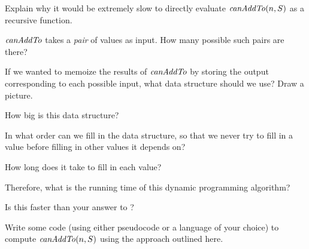 \documentclass{tufte-handout}
\begin{document}
\begin{questions}
  \item Explain why it would be extremely slow to directly evaluate
    $\mathit{canAddTo}(n,S)$ as a recursive function.
  \item $\mathit{canAddTo}$ takes a \emph{pair} of values as input.  How many
    possible such pairs are there?
  \item If we wanted to memoize the results of $\mathit{canAddTo}$ by storing
    the output corresponding to each possible input, what data
    structure should we use?  Draw a picture.
  \item How big is this data structure?
  \newpage
  \item In what order can we fill in the data structure, so that we
    never try to fill in a value before filling in other values it
    depends on?
  \item How long does it take to fill in each value?
  \item Therefore, what is the running time of this dynamic
    programming algorithm?
  \item Is this faster than your answer to
    ?
  \item Write some code (using either pseudocode or a language of your
    choice) to compute $\mathit{canAddTo}(n,S)$ using the approach outlined
    here.
\end{questions}
\end{document}
